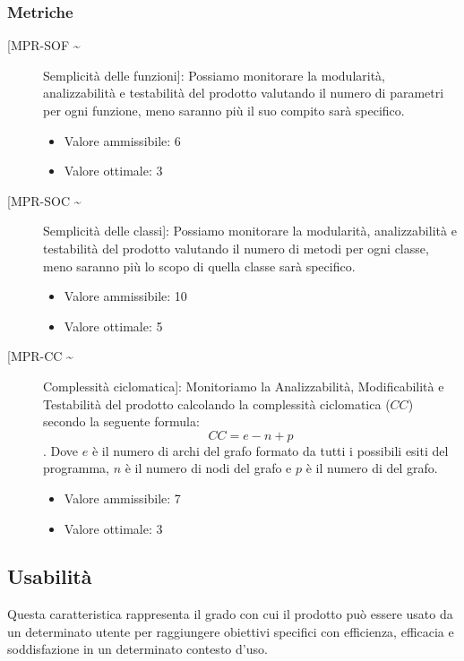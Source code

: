 \documentclass[../piano-di-qualifica.tex]{subfiles}
\begin{document}
\subsubsection{Metriche}%
\label{subs:metriche}
  \begin{description}
    \item [[MPR-SOF \textasciitilde] Semplicità delle funzioni]: Possiamo monitorare la modularità, analizzabilità e testabilità del prodotto valutando il numero di parametri per ogni funzione, meno saranno più il suo compito sarà specifico.
      \begin{itemize}   \item Valore ammissibile: \leq{}  6 \item Valore ottimale: \leq{}  3 \end{itemize}
    \item [[MPR-SOC \textasciitilde] Semplicità delle classi]: Possiamo monitorare la modularità, analizzabilità e testabilità del prodotto valutando il numero di metodi per ogni classe, meno saranno più lo scopo di quella classe sarà specifico.
      \begin{itemize} \item Valore ammissibile: \leq{}  10 \item Valore ottimale: \leq{}  5 \end{itemize}
    \item [[MPR-CC \textasciitilde] Complessità ciclomatica]: Monitoriamo la Analizzabilità, Modificabilità e Testabilità del prodotto calcolando la complessità ciclomatica (\(CC\)) secondo la seguente formula: \begin{equation} CC = e - n + p \end{equation}. Dove \(e\) è il numero di archi del grafo formato da tutti i possibili esiti del programma, \(n\) è il numero di nodi del grafo e \(p\) è il numero di  del grafo.
      \begin{itemize} \item Valore ammissibile: \leq{}  7 \item Valore ottimale: \leq{}  3 \end{itemize}
  \end{description}


\subsection{Usabilità}%
\label{sub:usabilita}
Questa caratteristica rappresenta il grado con cui il prodotto può essere usato da un determinato utente per raggiungere obiettivi specifici con efficienza, efficacia e soddisfazione in un determinato contesto d'uso.
\end{document}
